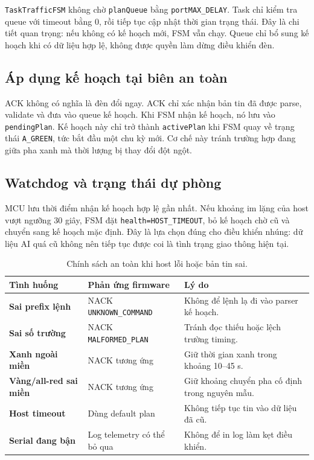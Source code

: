 \texttt{TaskTrafficFSM} không chờ \texttt{planQueue} bằng \texttt{portMAX\_DELAY}. Task chỉ kiểm tra queue với timeout bằng 0, rồi tiếp tục cập nhật thời gian trạng thái. Đây là chi tiết quan trọng: nếu không có kế hoạch mới, FSM vẫn chạy. Queue chỉ bổ sung kế hoạch khi có dữ liệu hợp lệ, không được quyền làm dừng điều khiển đèn.

\subsection{Áp dụng kế hoạch tại biên an toàn}

ACK không có nghĩa là đèn đổi ngay. ACK chỉ xác nhận bản tin đã được parse, validate và đưa vào queue kế hoạch. Khi FSM nhận kế hoạch, nó lưu vào \texttt{pendingPlan}. Kế hoạch này chỉ trở thành \texttt{activePlan} khi FSM quay về trạng thái \texttt{A\_GREEN}, tức bắt đầu một chu kỳ mới. Cơ chế này tránh trường hợp đang giữa pha xanh mà thời lượng bị thay đổi đột ngột.


\subsection{Watchdog và trạng thái dự phòng}

MCU lưu thời điểm nhận kế hoạch hợp lệ gần nhất. Nếu khoảng im lặng của host vượt ngưỡng 30 giây, FSM đặt \texttt{health=HOST\_TIMEOUT}, bỏ kế hoạch chờ cũ và chuyển sang kế hoạch mặc định. Đây là lựa chọn đúng cho điều khiển nhúng: dữ liệu AI quá cũ không nên tiếp tục được coi là tình trạng giao thông hiện tại.

\begin{table}[H]
\centering
\caption{Chính sách an toàn khi host lỗi hoặc bản tin sai.}
\label{tab:safety-policy}
\small
\begin{tabularx}{\linewidth}{>{\bfseries}p{3.8cm}YY}
\toprule
Tình huống & Phản ứng firmware & Lý do \\
\midrule
Sai prefix lệnh & NACK \texttt{UNKNOWN\_COMMAND} & Không để lệnh lạ đi vào parser kế hoạch. \\
Sai số trường & NACK \texttt{MALFORMED\_PLAN} & Tránh đọc thiếu hoặc lệch trường timing. \\
Xanh ngoài miền & NACK tương ứng & Giữ thời gian xanh trong khoảng 10--45 s. \\
Vàng/all-red sai miền & NACK tương ứng & Giữ khoảng chuyển pha cố định trong nguyên mẫu. \\
Host timeout & Dùng default plan & Không tiếp tục tin vào dữ liệu đã cũ. \\
Serial đang bận & Log telemetry có thể bỏ qua & Không để in log làm kẹt điều khiển. \\
\bottomrule
\end{tabularx}
\normalsize
\end{table}

